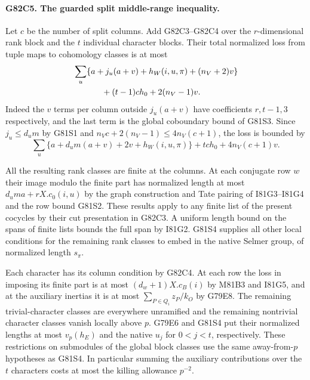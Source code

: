 \paragraph{G82C5. The guarded split middle-range inequality.}
Let $c$ be the number of split columns. Add G82C3--G82C4 over
the $r$-dimensional rank block and the $t$ individual character
blocks. Their total normalized loss from tuple maps to cohomology
classes is at most
\[
 \begin{aligned}
 &\sum_u\{a+j_u(a+v)+h_W(i,u,\pi)+(n_V+2)v\}\\
 &\hspace{12mm} +(t-1)c h_0+2(n_V-1)v .
 \end{aligned}
\]
Indeed the $v$ terms per column outside $j_u(a+v)$ have
coefficients $r,t-1,3$ respectively, and the last term is the
global coboundary bound of G81S3. Since $j_u\le d_u m$ by G81S1
and $n_V c+2(n_V-1)\le4n_V(c+1)$, the loss is bounded by
\[
 \sum_u\{a+d_um(a+v)+2v+h_W(i,u,\pi)\}
                 +tc h_0+4n_V(c+1)v.
\]

All the resulting rank classes are finite at the columns. At each
conjugate row $w$ their image modulo the finite part has normalized
length at most $d_um a+rX.c_0(i,u)$ by the graph construction and
Tate pairing of I81G3--I81G4 and the row bound G81S2. These results
apply to any finite list of the present cocycles by their cut
presentation in G82C3. A uniform length bound on the spans of
finite lists bounds the full span by I81G2. G81S4 supplies all
other local conditions for the remaining rank classes to embed
in the native Selmer group, of normalized length $s_\pi$.

Each character has its column condition by G82C4. At each row the
loss in imposing its finite part is at most $(d_w+1)X.c_B(i)$
by M81B3 and I81G5, and at the auxiliary inertias it is at most
$\sum_{P\in Q_i}z_P/k_O$ by G79E8. The remaining trivial-character
classes are everywhere unramified and the remaining nontrivial
character classes vanish locally above $p$. G79E6 and G81S4 put
their normalized lengths at most $v_p(h_E)$ and the native $u_j$
for $0<j<t$, respectively. These restrictions on submodules of
the global block classes use the same away-from-$p$ hypotheses as
G81S4. In particular summing the auxiliary contributions over the
$t$ characters costs at most the killing allowance $p^{-2}$.

